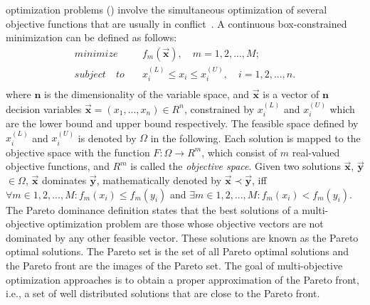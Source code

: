  optimization problems (\MOPS{}) %
%
involve the simultaneous optimization of several objective functions that are usually in conflict~\cite{Joel:Kalyanmoy}. 
%
A continuous box-constrained minimization \MOP{} can be defined as follows:
\begin{equation}
   \begin{split}
    minimize \quad & f_m(\vec{\mathbf{x}}), \quad m = 1, 2,...,M;\\
   subject \quad to \quad &  x_i^{(L)} \leq x_i \leq x_i^{(U)}, \quad i=1,2,..., n. \\
   \end{split}
\end{equation}
where $\mathbf{n}$ is the dimensionality of the variable space, and $\vec{\mathbf{x}}$ is a vector of $\mathbf{n}$ decision variables $\vec{\mathbf{x}}=(x_1, ..., x_n) \in R^n$, constrained by $x_i^{(L)}$ and $x_i^{(U)}$ which are the lower bound and upper bound respectively.
%
The feasible space defined by $x_i^{(L)}$ and $x_i^{(U)}$ is denoted by $\Omega$ in the following.
%
Each solution is mapped to the objective space with the function $F : \Omega \rightarrow R^m$, which consist of $m$ real-valued objective functions, and $R^m$ is called the \textit{objective space}. 
%
Given two solutions $\vec{\mathbf{x}}$, $\vec{\mathbf{y}}$ $\in \Omega$, $\vec{\mathbf{x}}$ dominates $\vec{\mathbf{y}}$, mathematically denoted by $\vec{\mathbf{x}} \prec \vec{\mathbf{y}}$, iff $\forall m \in {1,2,...,M} : f_m(x_i) \leq f_m(y_i)$ and $\exists  m \in {1,2,...,M} : f_m(x_i) < f_m(y_i)$.
%
%
The Pareto dominance definition states that the best solutions of a multi-objective optimization problem are those whose objective vectors are not dominated by any other feasible vector.
%
These solutions are known as the Pareto optimal solutions.
%
%
The Pareto set is the set of all Pareto optimal solutions and the Pareto front are the images of the Pareto set. 
%
The goal of multi-objective optimization approaches is to obtain a proper approximation of the Pareto front, i.e., 
a set of well distributed solutions that are close to the Pareto front.

